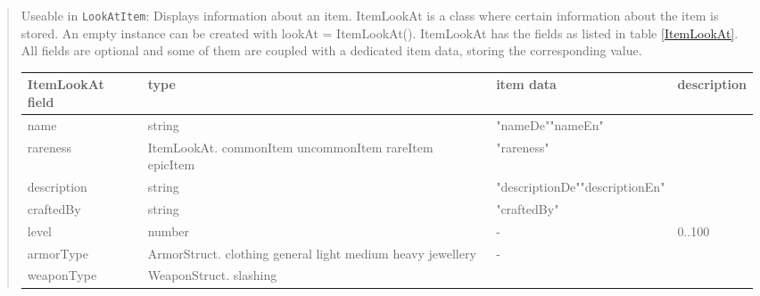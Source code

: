 \documentclass[a4paper,10pt,makeidx]{scrreprt}
\newcommand{\comm}[1]{\index{#1}\texttt{#1}}
\begin{document}
\begin{quote}
       Useable in \comm{LookAtItem}: Displays information about an item. ItemLookAt is a class where certain information about the item is stored. An empty instance can be created with lookAt = ItemLookAt(). ItemLookAt has the fields as listed in table \ref{ItemLookAt}. All fields are optional and some of them are coupled with a dedicated item data, storing the corresponding value.

\begin{table}
\begin{tabular}{l|p{3.8cm}|p{3cm}|p{3.5cm}}
    ItemLookAt field & type & item data & description\\ \hline
    name & string & "nameDe"\newline"nameEn"\\
    rareness & ItemLookAt.\newline
        \hspace*{5mm}commonItem\newline
        \hspace*{5mm}uncommonItem\newline
        \hspace*{5mm}rareItem\newline
        \hspace*{5mm}epicItem & "rareness"\\
    description & string & "descriptionDe"\newline"descriptionEn"\\
    craftedBy & string & "craftedBy"\\
    level & number & - & 0..100\\
    armorType & ArmorStruct.\newline
        \hspace*{5mm}clothing\newline
        \hspace*{5mm}general\newline
        \hspace*{5mm}light\newline
        \hspace*{5mm}medium\newline
        \hspace*{5mm}heavy\newline
        \hspace*{5mm}jewellery & - \\
    weaponType & WeaponStruct.\newline
        \hspace*{5mm}slashing\newline

\end{tabular}
\end{table}
\end{quote}
\end{document}

